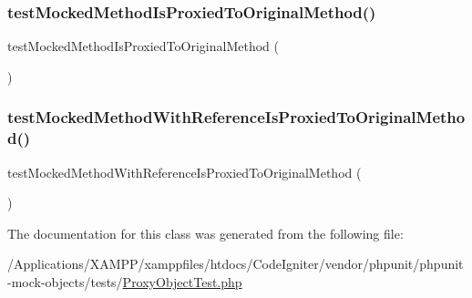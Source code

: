 \subsubsection{\texorpdfstring{test\+Mocked\+Method\+Is\+Proxied\+To\+Original\+Method()}{testMockedMethodIsProxiedToOriginalMethod()}}
{\footnotesize\ttfamily test\+Mocked\+Method\+Is\+Proxied\+To\+Original\+Method (\begin{DoxyParamCaption}{ }\end{DoxyParamCaption})}

\mbox{\label{class_framework___proxy_object_test_a4982c8994953fdf9847effd93a5b5d72}} 
\subsubsection{\texorpdfstring{test\+Mocked\+Method\+With\+Reference\+Is\+Proxied\+To\+Original\+Method()}{testMockedMethodWithReferenceIsProxiedToOriginalMethod()}}
{\footnotesize\ttfamily test\+Mocked\+Method\+With\+Reference\+Is\+Proxied\+To\+Original\+Method (\begin{DoxyParamCaption}{ }\end{DoxyParamCaption})}



The documentation for this class was generated from the following file\+:\begin{DoxyCompactItemize}
\item 
/\+Applications/\+X\+A\+M\+P\+P/xamppfiles/htdocs/\+Code\+Igniter/vendor/phpunit/phpunit-\/mock-\/objects/tests/\mbox{\hyperlink{_proxy_object_test_8php}{Proxy\+Object\+Test.\+php}}\end{DoxyCompactItemize}
